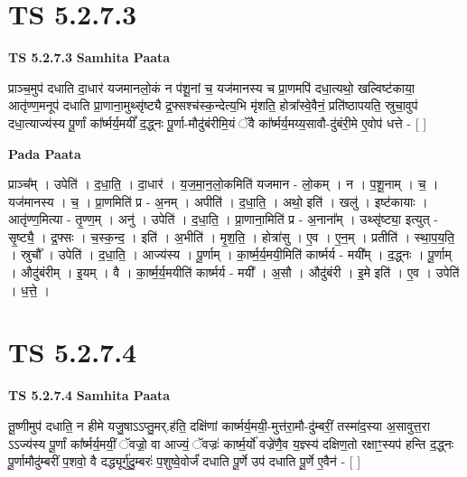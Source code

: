 \documentclass[17pt]{extarticle}
\begin{document}
\section*{ TS 5.2.7.3 }

\textbf{TS 5.2.7.3 } \newline
\textbf{Samhita Paata} \newline

प्राञ्च॒मुप॑ दधाति दा॒धार॑ यजमानलो॒कं न प॑शू॒नां च॒ यज॑मानस्य च प्रा॒णमपि॑ दधा॒त्यथो॒ खल्विष्ट॑काया॒ आतृ॑ण्ण॒मनूप॑ दधाति प्रा॒णाना॒मुथ्सृ॑ष्ट्यै द्र॒फ्सश्च॑स्क॒न्देत्य॒भि मृ॑शति॒ होत्रा᳚स्वे॒वैनं॒ प्रति॑ष्ठापयति॒ स्रुचा॒वुप॑ दधा॒त्याज्य॑स्य पू॒र्णां का᳚र्ष्मर्य॒मयीं᳚ द॒द्ध्नः पू॒र्णा-मौदु॑बंरीमि॒यं ॅवै का᳚र्ष्मर्य॒मय्य॒सावौ-दु॑बंरी॒मे ए॒वोप॑ धत्ते - [  ] \newline

\textbf{Pada Paata} \newline

प्राञ्च᳚म् । उपेति॑ । द॒धा॒ति॒ । दा॒धार॑ । य॒ज॒मा॒न॒लो॒कमिति॑ यजमान - लो॒कम् । न । प॒शू॒नाम् । च॒ । यज॑मानस्य । च॒ । प्रा॒णमिति॑ प्र - अ॒नम् । अपीति॑ । द॒धा॒ति॒ । अथो॒ इति॑ । खलु॑ । इष्ट॑कायाः । आतृ॑ण्ण॒मित्या - तृ॒ण्ण॒म् । अनु॑ । उपेति॑ । द॒धा॒ति॒ । प्रा॒णाना॒मिति॑ प्र - अ॒नाना᳚म् । उथ्सृ॑ष्ट्या॒ इत्युत् - सृ॒ष्ट्यै॒ । द्र॒फ्सः । च॒स्क॒न्द॒ । इति॑ । अ॒भीति॑ । मृ॒श॒ति॒ । होत्रा॑सु । ए॒व । ए॒न॒म् । प्रतीति॑ । स्था॒प॒य॒ति॒ । स्रुचौ᳚ । उपेति॑ । द॒धा॒ति॒ । आज्य॑स्य । पू॒र्णाम् । का॒र्ष्म॒र्य॒मयी॒मिति॑ कार्ष्मर्य - मयी᳚म् । द॒द्ध्नः । पू॒र्णाम् । औदु॑बंरीम् । इ॒यम् । वै । का॒र्ष्म॒र्य॒मयीति॑ कार्ष्मर्य - मयी᳚ । अ॒सौ । औदु॑बंरी । इ॒मे इति॑ । ए॒व । उपेति॑ । ध॒त्ते॒ ।  \newline




\section*{ TS 5.2.7.4 }

\textbf{TS 5.2.7.4 } \newline
\textbf{Samhita Paata} \newline

तू॒ष्णीमुप॑ दधाति॒ न हीमे यजु॒षाऽऽप्तु॒मर्.ह॑ति॒ दक्षि॑णां कार्ष्मर्य॒मयी॒-मुत्त॑रा॒मौ-दु॑म्बरीं॒ तस्मा॑द॒स्या अ॒सावुत्त॒रा ऽऽज्य॑स्य पू॒र्णां का᳚र्ष्मर्य॒मयीं॒ ॅवज्रो॒ वा आज्यं॒ ॅवज्रः॑ कार्ष्म॒र्यो॑ वज्रे॑णै॒व य॒ज्ञ्स्य॑ दक्षिण॒तो रक्षाꣳ॒॒स्यप॑ हन्ति द॒द्ध्नः पू॒र्णामौदु॑म्बरीं प॒शवो॒ वै दद्ध्यूर्गु॑दु॒म्बरः॑ प॒शुष्वे॒वोर्जं॑ दधाति पू॒र्णे उप॑ दधाति पू॒र्णे ए॒वैन॑ - [  ] \newline
\end{document}
